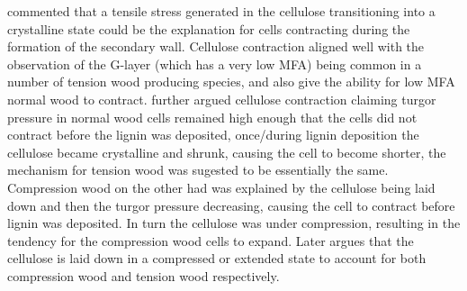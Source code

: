 \cite{wardrop1965} commented that a tensile stress generated in the cellulose
transitioning into a crystalline state could be the explanation for cells
contracting during the formation of the secondary wall. Cellulose contraction
aligned well with the observation of the G-layer (which has a very low
MFA) being common in a number of tension wood producing species, and also give
the ability for low MFA normal wood to contract. \cite{Bamber1979} further argued
cellulose contraction claiming turgor pressure in normal wood cells remained
high enough that the cells did not contract before the lignin was deposited,
once/during lignin deposition the cellulose became crystalline and shrunk,
causing the cell to become shorter, the mechanism for tension wood was sugested to be
essentially the same. Compression wood on the other had was explained by the
cellulose being laid down and then the turgor pressure decreasing, causing the
cell to contract before lignin was deposited. In turn the cellulose was under
compression, resulting in the tendency for the compression wood cells to
expand. Later \cite{bamber2001general} argues that the cellulose is laid down in a compressed or extended state to account for both compression wood and tension wood respectively. 